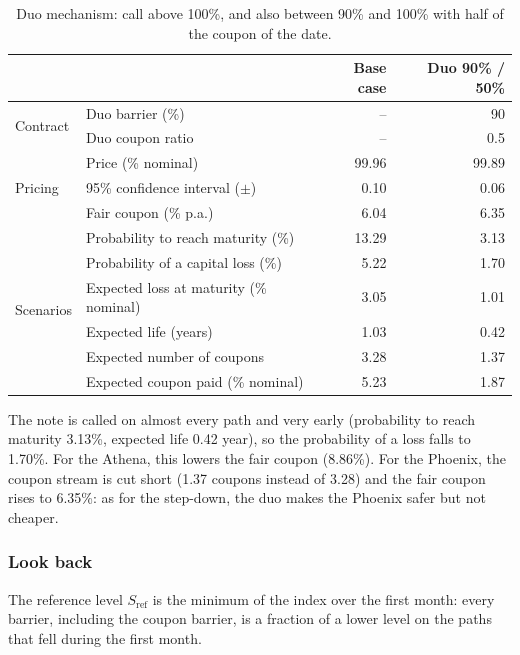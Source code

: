 \documentclass[11pt,a4paper]{article}
\newcommand{\Sref}{S_{\mathrm{ref}}}
\begin{document}
\begin{table}[htbp]
  \centering
  \small
  \begin{tabular}{llrr}
    \toprule
     & & \textbf{Base case} & \textbf{Duo 90\% / 50\%} \\
    \midrule
    \multirow{2}{*}{Contract}
      & Duo barrier (\%) & -- & 90 \\
      & Duo coupon ratio & -- & 0.5 \\
    \midrule
    \multirow{3}{*}{Pricing}
      & Price (\% nominal) & 99.96 & 99.89 \\
      & 95\% confidence interval ($\pm$) & 0.10 & 0.06 \\
      & Fair coupon (\% p.a.) & 6.04 & 6.35 \\
    \midrule
    \multirow{6}{*}{Scenarios}
      & Probability to reach maturity (\%) & 13.29 & 3.13 \\
      & Probability of a capital loss (\%) & 5.22 & 1.70 \\
      & Expected loss at maturity (\% nominal) & 3.05 & 1.01 \\
      & Expected life (years) & 1.03 & 0.42 \\
      & Expected number of coupons & 3.28 & 1.37 \\
      & Expected coupon paid (\% nominal) & 5.23 & 1.87 \\
    \bottomrule
  \end{tabular}
  \caption{Duo mechanism: call above 100\%, and also between 90\% and 100\% with half of the coupon of the date.}
  \label{tab:phoenix-duo}
\end{table}

The note is called on almost every path and very early (probability to reach maturity 3.13\%, expected life 0.42
year), so the probability of a loss falls to 1.70\%. For the Athena, this lowers the fair coupon (8.86\%). For the
Phoenix, the coupon stream is cut short (1.37 coupons instead of 3.28) and the fair coupon rises to 6.35\%: as for
the step-down, the duo makes the Phoenix safer but not cheaper.

\clearpage
\subsubsection{Look back}

The reference level $\Sref$ is the minimum of the index over the first month: every barrier, including the coupon
barrier, is a fraction of a lower level on the paths that fell during the first month.
\end{document}
